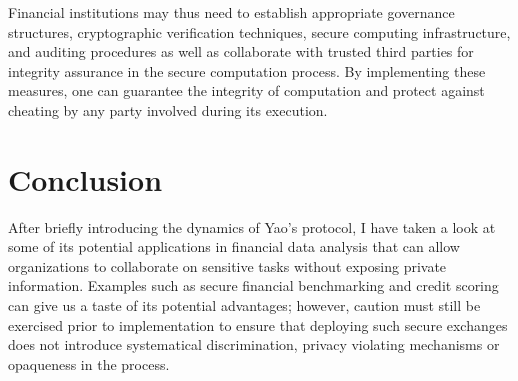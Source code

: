 \documentclass[12pt]{article}
\begin{document}
Financial institutions may thus need to establish appropriate governance structures, cryptographic verification techniques, secure computing infrastructure, and auditing procedures as well as collaborate with trusted third parties for integrity assurance in the secure computation process. By implementing these measures, one can guarantee the integrity of computation and protect against cheating by any party involved during its execution.

\section{Conclusion}\label{sec:conclusions}

After briefly introducing the dynamics of Yao's protocol, I have taken a look at some of its potential applications in financial data analysis that can allow organizations to collaborate on sensitive tasks without exposing private information. Examples such as secure financial benchmarking and credit scoring can give us a taste of its potential advantages; however, caution must still be exercised prior to implementation to ensure that deploying such secure exchanges does not introduce systematical discrimination, privacy violating mechanisms or opaqueness in the process.

{\footnotesize

}
\end{document}
